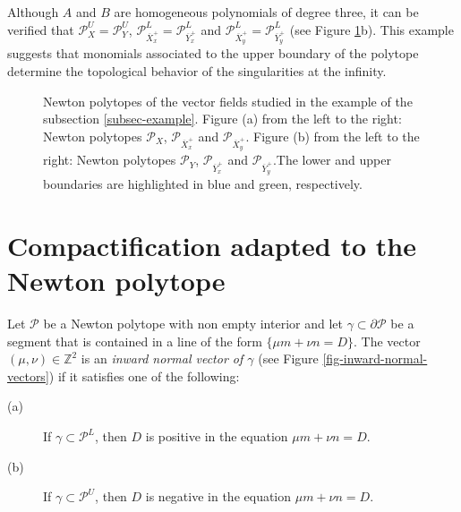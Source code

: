 \documentclass[12pt]{amsart}
\begin{document}
Although $A$ and $B$ are homogeneous polynomials of degree three, it can be verified that $\mathcal{P}^{U}_{X} = \mathcal{P}^{U}_{Y}$, $\mathcal{P}^{L}_{\overline{X}^{+}_{x}} = \mathcal{P}^{L}_{\overline{Y}^{+}_{x}}$ and $\mathcal{P}^{L}_{\overline{X}^{+}_{y}} = \mathcal{P}^{L}_{\overline{Y}^{+}_{y}}$ (see Figure \ref{fig-exe-plc}b). This example suggests that monomials associated to the upper boundary of the polytope determine the topological behavior of the singularities at the infinity.

\begin{figure}[h]
\caption{\footnotesize{Newton polytopes of the vector fields studied in the example of the subsection \ref{subsec-example}. Figure (a) from the left to the right: Newton polytopes $\mathcal{P}_{X}$, $\mathcal{P}_{\overline{X}^{+}_{x}}$ and $\mathcal{P}_{\overline{X}^{+}_{y}}$. Figure (b) from the left to the right: Newton polytopes $\mathcal{P}_{Y}$, $\mathcal{P}_{\overline{Y}^{+}_{x}}$ and $\mathcal{P}_{\overline{Y}^{+}_{y}}$.The lower and upper boundaries are highlighted in blue and green, respectively.}}
\label{fig-exe-plc}
\end{figure}

\section{Compactification adapted to the Newton polytope}\label{sec-compact-adapted}

Let $\mathcal{P}$ be a Newton polytope with non empty interior and let $\gamma\subset\partial\mathcal{P}$ be a segment that is contained in a line of the form $\{\mu m + \nu n = D\}$. The vector $(\mu,\nu)\in\mathbb{Z}^{2}$ is an \emph{inward normal vector of $\gamma$} (see Figure \ref{fig-inward-normal-vectors}) if it satisfies one of the following:
\begin{description}
    \item[(a)] If $\gamma\subset\mathcal{P}^{L}$, then $D$ is positive in the equation $\mu m + \nu n = D$.
    \item[(b)] If $\gamma\subset\mathcal{P}^{U}$, then $D$ is negative in the equation $\mu m + \nu n = D$.
\end{description}
\end{document}
